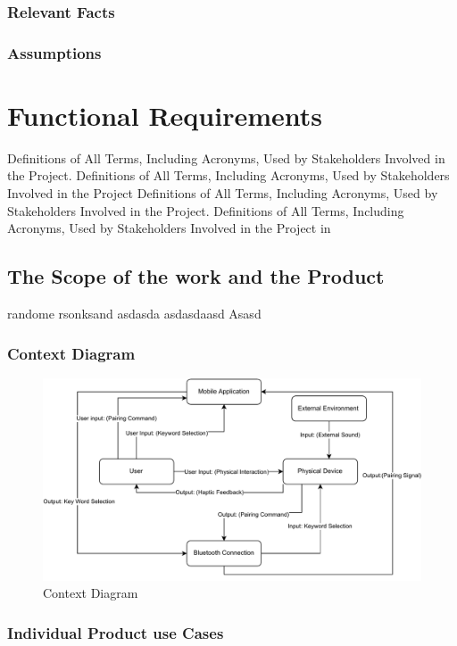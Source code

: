 \documentclass[12pt]{article}
\begin{document}
\subsubsection{Relevant Facts}

\subsubsection{Assumptions}

\section{Functional Requirements}
Definitions of All Terms, Including Acronyms, Used by Stakeholders Involved in the Project. Definitions of All Terms, Including Acronyms, Used by Stakeholders Involved in the Project
Definitions of All Terms, Including Acronyms, Used by Stakeholders Involved in the Project. Definitions of All Terms, Including Acronyms, Used by Stakeholders Involved in the Project in 
\subsection{The Scope of the work and the Product}
randome rsonksand
asdasda
asdasdaasd
Asasd

\subsubsection{Context Diagram}

\begin{figure}[H]
  \begin{center}
    \includegraphics{WC.pdf}
  \caption{Context Diagram}
  \label{ContextDiagram} 
  \end{center}
  \end{figure}

\subsubsection{Individual Product use Cases}
\end{document}
